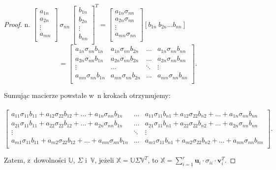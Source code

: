 \documentclass[12pt,a4paper]{report}
\begin{document}
\begin{proof}
n.
$\left[ \begin{array}{c}
         a_{1n} \\
         a_{2n} \\
         \vdots \\
         a_{mn} \\
         \end{array}
      \right] \: \sigma_{nn} \: \left[ \begin{array}{c}
         b_{1n} \\
         b_{2n} \\
         \vdots \\
         b_{nn} \\
         \end{array}
      \right]^T= \left[
        \begin{array}{c}
         a_{1n} \sigma_{nn} \\
         a_{2n} \sigma_{nn} \\
         \vdots \\
         a_{mn} \sigma_{nn} \\
         \end{array}
      \right] [b_{1n} \: b_{2n} \ldots b_{nn}] $
      $$=  \left[
        \begin{array}{cccc}
         a_{1n} \sigma_{nn} b_{1n}  & a_{1n} \sigma_{nn} b_{2n} & \ldots & a_{1n} \sigma_{nn} b_{nn}  \\
         a_{2n} \sigma_{nn} b_{1n} & a_{2n} \sigma_{nn} b_{2n} & \ldots & a_{2n} \sigma_{nn} b_{nn} \\
         \vdots & \ldots & \ddots & \vdots \\
         a_{mn} \sigma_{nn} b_{1n} & a_{mn} \sigma_{nn} b_{2n} & \ldots & a_{mn} \sigma_{nn} b_{nn} \\
         \end{array}
      \right]. $$

Sumując macierze powstałe w~n krokach otrzymujemy:
\\
\\$\left[
        \begin{array}{ccc}
a_{11} \sigma_{11} b_{11} + a_{12} \sigma_{22} b_{12} + \ldots + a_{1n} \sigma_{nn} b_{1n} & \ldots &  a_{11} \sigma_{11} b_{n1} + a_{12} \sigma_{22} b_{n2} + \ldots + a_{1n} \sigma_{nn} b_{nn} \\
a_{21} \sigma_{11} b_{11} + a_{22} \sigma_{22} b_{12} + \ldots + a_{2n} \sigma_{nn} b_{1n} & \ldots & a_{21} \sigma_{11} b_{n1} + a_{22} \sigma_{22} b_{n2} + \ldots + a_{2n} \sigma_{nn} b_{nn} \\
         \vdots & \ddots & \vdots \\
a_{m1} \sigma_{11} b_{11} + a_{m2} \sigma_{22} b_{12} + \ldots + a_{mn} \sigma_{nn} b_{1n} & \ldots & a_{m1} \sigma_{11} b_{n1} + a_{m2} \sigma_{22} b_{n2} + \ldots + a_{mn} \sigma_{nn} b_{nn} \\
         \end{array}
      \right].$

\bigskip
Zatem, z~dowolności $\mathbb{U}$, $\Sigma$ i~$\mathbb{V}$, jeżeli $\mathbb{X}=\mathbb{U} \Sigma \mathbb{V}^T$, to $\mathbb{X} = \sum_{i=1}^r \mathbf{u}_i \cdot\sigma_{ii} \cdot \mathbf{v}_i^T$.
\end{proof}
\bigskip
\end{document}
